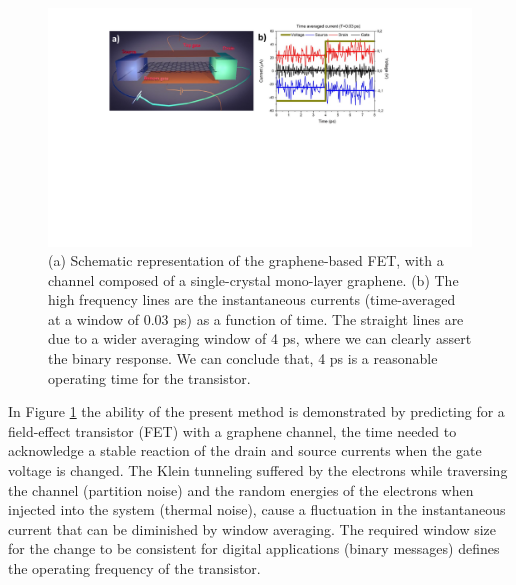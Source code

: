 \documentclass[11pt, a4paper]{article} %
\begin{document}
\begin{figure}[h!]
  \centering
  \hspace*{-0.3cm}
   \includegraphics[width=0.71\linewidth]{Figures/figurefinal.pdf}\vspace{-0.3cm}
   \caption{(a) Schematic representation of the graphene-based FET, with a channel composed of a single-crystal mono-layer graphene. (b) The high frequency lines are the instantaneous currents (time-averaged at a window of $0.03$ ps) as a function of time. The straight lines are due to a wider averaging window of 4 ps, where we can clearly assert the binary response. We can conclude that, 4 ps is a reasonable operating time for the transistor.}
  \label{fig:fig}
\end{figure}

In Figure \ref{fig:fig} the ability of the present method is demonstrated \cite{inject,Thz} by predicting for a field-effect transistor (FET) with a graphene channel, the time needed to acknowledge a stable reaction of the drain and source currents when the gate voltage is changed. The Klein tunneling suffered by the electrons while traversing the channel (partition noise) and the random energies of the electrons when injected into the system (thermal noise), cause a fluctuation in the instantaneous current that can be diminished by window averaging. The required window size for the change to be consistent for digital applications (binary messages) defines the operating frequency of the transistor.\vspace{-0.25cm}


 
\end{document}
